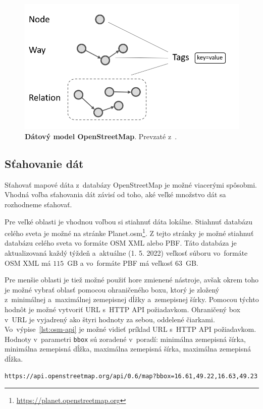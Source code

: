 \begin{figure}[ht]
    \centering
    \includegraphics[width=0.7\linewidth]{obrazky-figures/openstreetmap-datamodel.png}
    \caption{\textbf{Dátový model OpenStreetMap}. Prevzaté z~\cite{jafari2022building}.}
    \label{fig:osmdatamodel}
\end{figure}

\subsection{Sťahovanie dát}
Sťahovať mapové dáta z~databázy OpenStreetMap je možné viacerými spôsobmi. Vhodná voľba sťahovania dát závisí od toho, aké veľké množstvo dát sa rozhodneme sťahovať.

Pre veľké oblasti je vhodnou voľbou si stiahnuť dáta lokálne. Stiahnuť databázu celého sveta je možné na stránke Planet.osm\footnote{\url{https://planet.openstreetmap.org}}. Z tejto stránky je možné stiahnuť databázu celého sveta vo formáte OSM XML alebo PBF. Táto databáza je aktualizovaná každý týždeň a~aktuálne (1. 5. 2022) veľkosť súboru vo~formáte OSM XML má $115$~GB a vo~formáte PBF má veľkosť $63$~GB.

Pre menšie oblasti je tiež možné použiť hore zmienené nástroje, avšak okrem toho je možné vybrať oblasť pomocou ohraničeného boxu, ktorý je zložený z~minimálnej a~maximálnej zemepisnej dĺžky a~zemepisnej šírky. Pomocou týchto hodnôt je možné vytvoriť URL s~HTTP API požiadavkom. Ohraničený box v~URL je vyjadrený ako štyri hodnoty za sebou, oddelené čiarkami. Vo~výpise~\ref{lst:osm-api} je možné vidieť príklad URL s~HTTP API požiadavkom. Hodnoty v~parametri \texttt{bbox} sú zoradené v~poradí: minimálna zemepisná šírka, minimálna zemepisná dĺžka, maximálna zemepisná šírka, maximálna zemepisná dĺžka.

\begin{lstlisting}
https://api.openstreetmap.org/api/0.6/map?bbox=16.61,49.22,16.63,49.23
\end{lstlisting}

